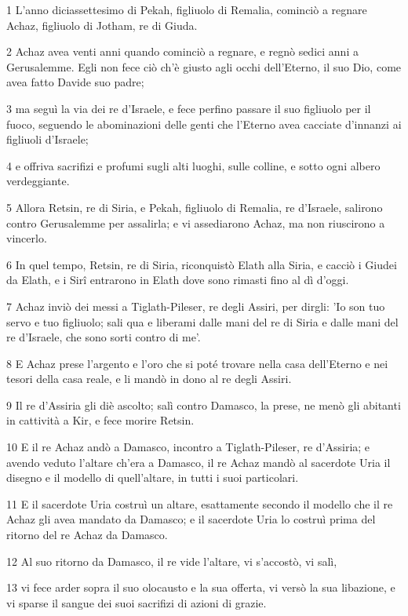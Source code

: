 \par 1 L'anno diciassettesimo di Pekah, figliuolo di Remalia, cominciò a regnare Achaz, figliuolo di Jotham, re di Giuda.
\par 2 Achaz avea venti anni quando cominciò a regnare, e regnò sedici anni a Gerusalemme. Egli non fece ciò ch'è giusto agli occhi dell'Eterno, il suo Dio, come avea fatto Davide suo padre;
\par 3 ma seguì la via dei re d'Israele, e fece perfino passare il suo figliuolo per il fuoco, seguendo le abominazioni delle genti che l'Eterno avea cacciate d'innanzi ai figliuoli d'Israele;
\par 4 e offriva sacrifizi e profumi sugli alti luoghi, sulle colline, e sotto ogni albero verdeggiante.
\par 5 Allora Retsin, re di Siria, e Pekah, figliuolo di Remalia, re d'Israele, salirono contro Gerusalemme per assalirla; e vi assediarono Achaz, ma non riuscirono a vincerlo.
\par 6 In quel tempo, Retsin, re di Siria, riconquistò Elath alla Siria, e cacciò i Giudei da Elath, e i Sirî entrarono in Elath dove sono rimasti fino al dì d'oggi.
\par 7 Achaz inviò dei messi a Tiglath-Pileser, re degli Assiri, per dirgli: 'Io son tuo servo e tuo figliuolo; sali qua e liberami dalle mani del re di Siria e dalle mani del re d'Israele, che sono sorti contro di me'.
\par 8 E Achaz prese l'argento e l'oro che si poté trovare nella casa dell'Eterno e nei tesori della casa reale, e li mandò in dono al re degli Assiri.
\par 9 Il re d'Assiria gli diè ascolto; salì contro Damasco, la prese, ne menò gli abitanti in cattività a Kir, e fece morire Retsin.
\par 10 E il re Achaz andò a Damasco, incontro a Tiglath-Pileser, re d'Assiria; e avendo veduto l'altare ch'era a Damasco, il re Achaz mandò al sacerdote Uria il disegno e il modello di quell'altare, in tutti i suoi particolari.
\par 11 E il sacerdote Uria costruì un altare, esattamente secondo il modello che il re Achaz gli avea mandato da Damasco; e il sacerdote Uria lo costruì prima del ritorno del re Achaz da Damasco.
\par 12 Al suo ritorno da Damasco, il re vide l'altare, vi s'accostò, vi salì,
\par 13 vi fece arder sopra il suo olocausto e la sua offerta, vi versò la sua libazione, e vi sparse il sangue dei suoi sacrifizi di azioni di grazie.

